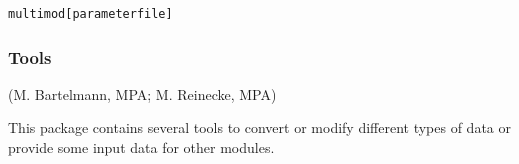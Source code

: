 \begin{alltt}
multimod [parameter file]


\end{alltt}



\subsubsection{Tools}
(M. Bartelmann, MPA; M. Reinecke, MPA)

This package contains several tools to convert or modify
different types of data or provide some input data for other modules.
